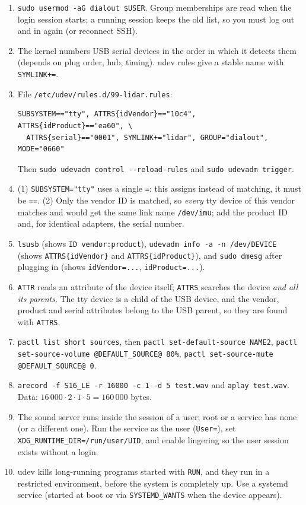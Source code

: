 \begin{enumerate}[label=\textbf{\ansnum.\arabic*}]
  \item \verb|sudo usermod -aG dialout $USER|. Group memberships are read when the login session starts; a running session keeps the old list, so you must log out and in again (or reconnect SSH).
  \item The kernel numbers USB serial devices in the order in which it detects them (depends on plug order, hub, timing). udev rules give a stable name with \texttt{SYMLINK+=}.
  \item File \texttt{/etc/udev/rules.d/99-lidar.rules}:
\begin{verbatim}
SUBSYSTEM=="tty", ATTRS{idVendor}=="10c4", ATTRS{idProduct}=="ea60", \
  ATTRS{serial}=="0001", SYMLINK+="lidar", GROUP="dialout", MODE="0660"
\end{verbatim}
  Then \verb|sudo udevadm control --reload-rules| and \verb|sudo udevadm trigger|.
  \item (1) \verb|SUBSYSTEM="tty"| uses a single \texttt{=}: this assigns instead of matching, it must be \verb|==|. (2) Only the vendor ID is matched, so \emph{every} tty device of this vendor matches and would get the same link name \texttt{/dev/imu}; add the product ID and, for identical adapters, the serial number.
  \item \verb|lsusb| (shows \texttt{ID vendor:product}), \verb|udevadm info -a -n /dev/DEVICE| (shows \texttt{ATTRS\{idVendor\}} and \texttt{ATTRS\{idProduct\}}), and \verb|sudo dmesg| after plugging in (shows \texttt{idVendor=...}, \texttt{idProduct=...}).
  \item \texttt{ATTR} reads an attribute of the device itself; \texttt{ATTRS} searches the device \emph{and all its parents}. The tty device is a child of the USB device, and the vendor, product and serial attributes belong to the USB parent, so they are found with \texttt{ATTRS}.
  \item \verb|pactl list short sources|, then \verb|pactl set-default-source NAME2|, \verb|pactl set-source-volume @DEFAULT_SOURCE@ 80%|, \verb|pactl set-source-mute @DEFAULT_SOURCE@ 0|.
  \item \verb|arecord -f S16_LE -r 16000 -c 1 -d 5 test.wav| and \verb|aplay test.wav|. Data: $16\,000\cdot2\cdot1\cdot5=160\,000$ bytes.
  \item The sound server runs inside the session of a user; root or a service has none (or a different one). Run the service as the user (\texttt{User=}), set \texttt{XDG\_RUNTIME\_DIR=/run/user/UID}, and enable lingering so the user session exists without a login.
  \item udev kills long-running programs started with \texttt{RUN}, and they run in a restricted environment, before the system is completely up. Use a systemd service (started at boot or via \texttt{SYSTEMD\_WANTS} when the device appears).
\end{enumerate}
